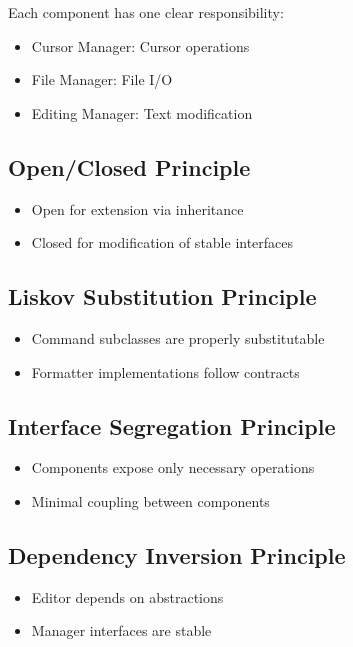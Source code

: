 \documentclass[12pt,a4paper,oneside,openany]{report}
\begin{document}
Each component has one clear responsibility:

\begin{itemize}
	\item Cursor Manager: Cursor operations
	\item File Manager: File I/O
	\item Editing Manager: Text modification
\end{itemize}

\subsection{Open/Closed Principle}

\begin{itemize}
	\item Open for extension via inheritance
	\item Closed for modification of stable interfaces
\end{itemize}

\subsection{Liskov Substitution Principle}

\begin{itemize}
	\item Command subclasses are properly substitutable
	\item Formatter implementations follow contracts
\end{itemize}

\subsection{Interface Segregation Principle}

\begin{itemize}
	\item Components expose only necessary operations
	\item Minimal coupling between components
\end{itemize}

\subsection{Dependency Inversion Principle}

\begin{itemize}
	\item Editor depends on abstractions
	\item Manager interfaces are stable
\end{itemize}
\end{document}
